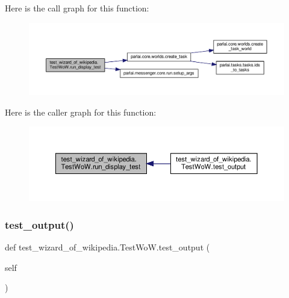 Here is the call graph for this function\+:
\nopagebreak
\begin{figure}[H]
\begin{center}
\leavevmode
\includegraphics[width=350pt]{classtest__wizard__of__wikipedia_1_1TestWoW_a8817f78f5eb9d33489bc79c305d174cc_cgraph}
\end{center}
\end{figure}
Here is the caller graph for this function\+:
\nopagebreak
\begin{figure}[H]
\begin{center}
\leavevmode
\includegraphics[width=350pt]{classtest__wizard__of__wikipedia_1_1TestWoW_a8817f78f5eb9d33489bc79c305d174cc_icgraph}
\end{center}
\end{figure}
\mbox{\label{classtest__wizard__of__wikipedia_1_1TestWoW_a5a2ccfeb297d1fa8b356bcb9c4ce2225}} 
\subsubsection{\texorpdfstring{test\+\_\+output()}{test\_output()}}
{\footnotesize\ttfamily def test\+\_\+wizard\+\_\+of\+\_\+wikipedia.\+Test\+Wo\+W.\+test\+\_\+output (\begin{DoxyParamCaption}\item[{}]{self }\end{DoxyParamCaption})}



